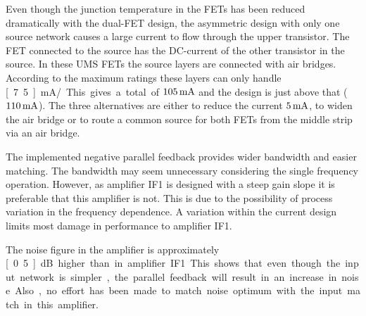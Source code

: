 			Even though the junction temperature in the FETs has been reduced dramatically with the dual-FET design, the asymmetric design with only one source network causes a large current to flow through the upper transistor. The FET connected to the source has the DC-current of the other transistor in the source. In these UMS FETs the source layers are connected with \unit[14]{\mum} air bridges. According to the maximum ratings these layers can only handle \unit[7.5]{mA/\mum}. This gives a total of $\unit[105]{mA}$ and the design is just above that ($\unit[110]{mA}$). The three alternatives are either to reduce the current $\unit[5]{mA}$, to widen the air bridge \unit[1]{\mum} or to route a common source for both FETs from the middle strip via an air bridge.
			
			The implemented negative parallel feedback provides wider bandwidth and easier matching. The bandwidth may seem unnecessary considering the single frequency operation. However, as amplifier IF1 is designed with a steep gain slope it is preferable that this amplifier is not. This is due to the possibility of process variation in the frequency dependence. A variation within the current design limits most damage in performance to amplifier IF1.
			
			The noise figure in the amplifier is approximately \unit[0.5]{dB} higher than in amplifier IF1. This shows that even though the input network is simpler, the parallel feedback will result in an increase in noise. Also, no effort has been made to match noise optimum with the input match in this amplifier.
		
		
		